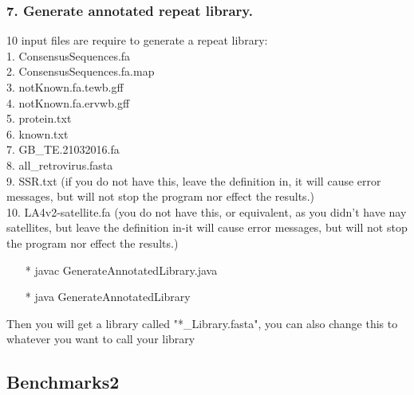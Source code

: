 \documentclass[12pt]{report}
\begin{document}
\subsubsection{7. Generate annotated repeat library.}
10 input files are require to generate a repeat library: \\
1. ConsensusSequences.fa \\
2. ConsensusSequences.fa.map \\
3. notKnown.fa.tewb.gff \\
4. notKnown.fa.ervwb.gff \\
5. protein.txt \\
6. known.txt \\
7. GB\_TE.21032016.fa \\
8. all\_retrovirus.fasta \\
9. SSR.txt (if you do not have this, leave the definition in, it will cause error messages, but will not stop the program nor effect the results.) \\
10. LA4v2-satellite.fa (you do not have this, or equivalent, as you didn't have nay satellites, but leave the definition in-it will cause error messages, but will not stop the program nor effect the results.)
\begin{enumerate}
	\item[*] javac GenerateAnnotatedLibrary.java
	\item[*] java GenerateAnnotatedLibrary
\end{enumerate}
Then you will get a library called "*\_Library.fasta", you can also change this to whatever you want to call your library

\subsection*{Benchmarks2}
\end{document}
